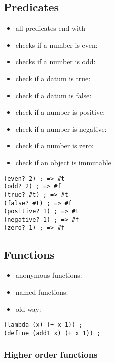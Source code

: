 \documentclass[a4paper,landscape,10pt]{article}
\begin{document}
\begin{multicols*}{2}
  \subsection{Predicates}

  \begin{itemize}
    \item all predicates end with 
    \item checks if a number is even: 
    \item checks if a number is odd: 
    \item check if a datum is true: 
    \item check if a datum is false: 
    \item check if a number is positive: 
    \item check if a number is negative: 
    \item check if a number is zero: 
    \item check if an object is immutable 
  \end{itemize}

  \begin{lstlisting}[language=Racket]
(even? 2) ; => #t
(odd? 2) ; => #f
(true? #t) ; => #t
(false? #t) ; => #f
(positive? 1) ; => #t
(negative? 1) ; => #f
(zero? 1) ; => #f
\end{lstlisting}

  \breakcolumn

  \subsection{Functions}

  \begin{itemize}
    \item anonymous functions: 
    \item named functions: 
    \item old way: 
  \end{itemize}

  \begin{lstlisting}[language=Racket]
(lambda (x) (+ x 1)) ;
(define (add1 x) (+ x 1)) ;
\end{lstlisting}

  \subsubsection{Higher order functions}


\end{multicols*}
\end{document}
